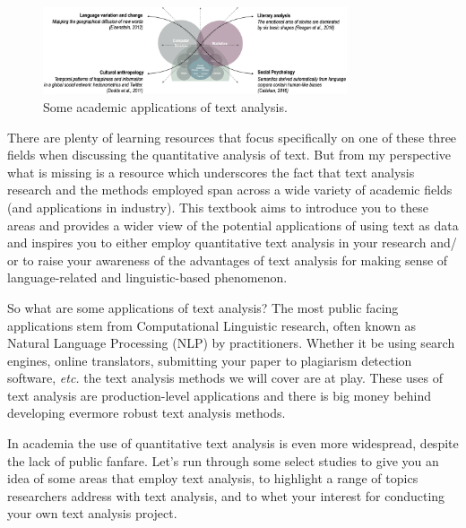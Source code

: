 \documentclass[
  letterpaper,
]{scrbook}
\begin{document}
\begin{figure}[h]

{\centering \includegraphics[width=0.8\textwidth,height=\textheight]{./figures/text-analysis/academic-language-applications.png}

}

\caption{\label{fig-academic-language-applications}Some academic
applications of text analysis.}

\end{figure}

There are plenty of learning resources that focus specifically on one of
these three fields when discussing the quantitative analysis of text.
But from my perspective what is missing is a resource which underscores
the fact that text analysis research and the methods employed span
across a wide variety of academic fields (and applications in industry).
This textbook aims to introduce you to these areas and provides a wider
view of the potential applications of using text as data and inspires
you to either employ quantitative text analysis in your research and/ or
to raise your awareness of the advantages of text analysis for making
sense of language-related and linguistic-based phenomenon.

So what are some applications of text analysis? The most public facing
applications stem from Computational Linguistic research, often known as
Natural Language Processing (NLP) by practitioners. Whether it be using
search engines, online translators, submitting your paper to plagiarism
detection software, \emph{etc.} the text analysis methods we will cover
are at play. These uses of text analysis are production-level
applications and there is big money behind developing evermore robust
text analysis methods.

In academia the use of quantitative text analysis is even more
widespread, despite the lack of public fanfare. Let's run through some
select studies to give you an idea of some areas that employ text
analysis, to highlight a range of topics researchers address with text
analysis, and to whet your interest for conducting your own text
analysis project.
\end{document}
